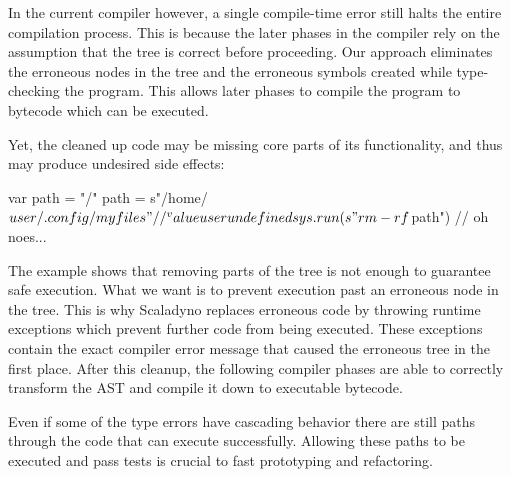 In the current compiler however, a single compile-time error still halts the entire compilation process. This is because the later phases in the compiler rely on the assumption that the tree is correct before proceeding. Our approach eliminates the erroneous nodes in the tree and the erroneous symbols created while type-checking the program. This allows later phases to compile the program to bytecode which can be executed.

Yet, the cleaned up code may be missing core parts of its functionality, and thus may produce undesired side effects:

\begin{lstlisting-nobreak}
 var path = "/"
 path = s"/home/$user/.config/myfiles"
 //                  ^ value user undefined
 sys.run(s"rm -rf $path") // oh noes...
\end{lstlisting-nobreak}

The example shows that removing parts of the tree is not enough to guarantee safe execution. What we want is to prevent execution past an erroneous node in the tree. This is why Scaladyno replaces erroneous code by throwing runtime exceptions which prevent further code from being executed. These exceptions contain the exact compiler error message that caused the erroneous tree in the first place. After this cleanup, the following compiler phases are able to correctly transform the AST and compile it down to executable bytecode.

Even if some of the type errors have cascading behavior there are still paths through the code that can execute successfully. Allowing these paths to be executed and pass tests is crucial to fast prototyping and refactoring.
